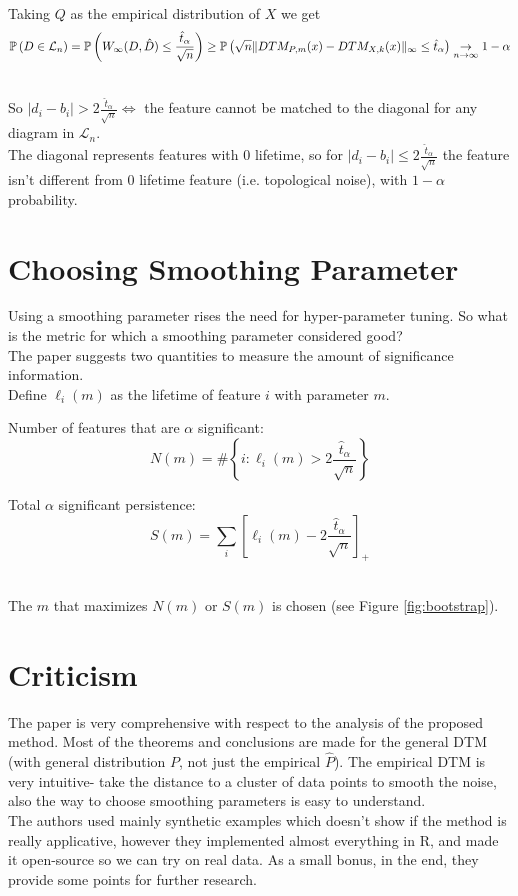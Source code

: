\documentclass[11pt]{article}
\theoremstyle{definition}
\theoremstyle{definition}
\begin{document}
\text{ }\\
Taking $Q$ as the empirical distribution of $X$ we get
$$\mathbb{P} \left( D \in \mathcal{L}_n \right) = \mathbb{P} \left( W_\infty (D, \hat D) \leq \frac{\hat t_\alpha}{\sqrt{n}} \right) \geq \mathbb{P} \left( \sqrt{n} \mathopen\| DTM_{P,m}(x) - DTM_{X,k}(x) \mathclose\|_\infty \leq \hat t_\alpha \right) \underset{n\rightarrow \infty}{\rightarrow} 1-\alpha$$

\text{ }\\
So $|d_i - b_i| > 2\frac{\hat t_\alpha}{\sqrt{n}} \Leftrightarrow$ the feature cannot be matched to the diagonal for any diagram in $\mathcal{L}_n$.\\
The diagonal represents features with 0 lifetime, so for $|d_i - b_i| \leq 2\frac{\hat t_\alpha}{\sqrt{n}}$ the feature isn't different from 0 lifetime feature (i.e. topological noise), with $1-\alpha$ probability.

\def\tha{\hat t_\alpha}
\def\ftn{2\frac{\tha}{\sqrt{n}}}
\section{Choosing Smoothing Parameter}
Using a smoothing parameter rises the need for hyper-parameter tuning. So what is the metric for which a smoothing parameter considered good?\\
The paper suggests two quantities to measure the amount of significance information.\\
Define $\ell_i(m)$ as the lifetime of feature $i$ with parameter $m$.

Number of features that are $\alpha$ significant:
$$N(m) = \# \left\{ i : \ell_i(m) > \ftn \right\}$$

Total $\alpha$ significant persistence:
$$S(m) = \sum_i \left[ \ell_i(m) - \ftn \right]_+$$

\text{ }\\
The $m$ that maximizes $N(m)$ or $S(m)$ is chosen (see Figure \ref{fig:bootstrap}).



\section{Criticism}

The paper is very comprehensive with respect to the analysis of the proposed method. Most of the theorems and conclusions are made for the general DTM (with general distribution $P$, not just the empirical $\hat P$).
The empirical DTM is very intuitive- take the distance to a cluster of data points to smooth the noise, also the way to choose smoothing parameters is easy to understand.\\
The authors used mainly synthetic examples which doesn't show if the method is really applicative, however they implemented almost everything in R, and made it open-source so we can try on real data. As a small bonus, in the end, they provide some points for further research.
\end{document}

